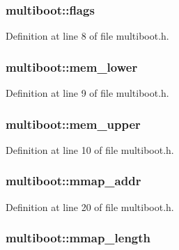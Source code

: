\hypertarget{structmultiboot_a4bd2793467fd4f7ed02ec304fff4eb81}{
\subsubsection[{flags}]{ multiboot\-::flags}}\label{structmultiboot_a4bd2793467fd4f7ed02ec304fff4eb81}


Definition at line 8 of file multiboot.\-h.

\hypertarget{structmultiboot_ac2b15c0a29fd98a3e1d957c9f8b9bd0b}{
\subsubsection[{mem\-\_\-lower}]{ multiboot\-::mem\-\_\-lower}}\label{structmultiboot_ac2b15c0a29fd98a3e1d957c9f8b9bd0b}


Definition at line 9 of file multiboot.\-h.

\hypertarget{structmultiboot_a1aaf0f2c74463a9906e25ce50cd8e871}{
\subsubsection[{mem\-\_\-upper}]{ multiboot\-::mem\-\_\-upper}}\label{structmultiboot_a1aaf0f2c74463a9906e25ce50cd8e871}


Definition at line 10 of file multiboot.\-h.

\hypertarget{structmultiboot_ac70f33ae46b06b6aeea2754e4e6f7b04}{
\subsubsection[{mmap\-\_\-addr}]{ multiboot\-::mmap\-\_\-addr}}\label{structmultiboot_ac70f33ae46b06b6aeea2754e4e6f7b04}


Definition at line 20 of file multiboot.\-h.

\hypertarget{structmultiboot_a777be6ba5e5eb725abe899dfc2aa5b62}{
\subsubsection[{mmap\-\_\-length}]{ multiboot\-::mmap\-\_\-length}}\label{structmultiboot_a777be6ba5e5eb725abe899dfc2aa5b62}


